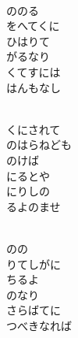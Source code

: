 \documentclass[10pt,b5j]{tarticle} %
\begin{document}
\begin{enumerate}
\begin{minipage}[c]{\blocksize}
        \vspace{\linespace}
        \item~\\
        ののる\\
        をへてくに\\
        ひはりて\\
        がるなり\\
        くてすには\\
        はんもなし
        
        \vspace{\linespace}
        \item~\\
        くにされて\\
        のはらねども\\
        のけば\\
        にるとや\\
        にりしの\\
        るよのませ
        
        \vspace{\linespace}
        \item~\\
        のの\\
        りてしがに\\
        ちるよ\\
        のなり\\
        さらばてに\\
        つべきなれば
    
    \end{minipage}
\end{enumerate} %
\end{document}

